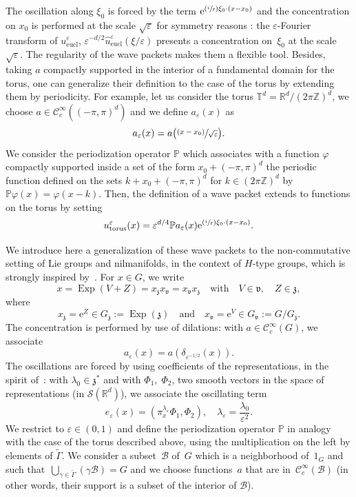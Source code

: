 \documentclass[JEP,XML,SOM,Unicode,published]{cedram}
\let\mathcal\mathscr
\newcommand{\Psfrac}[2]{(\sfrac{#1}{#2})}
\newcommand{\psfrac}[2]{\sfrac{(#1)}{#2}}
\newcommand{\eucl}{\mathrm{eucl}}
\newcommand{\rme}{\mathrm{e}}
\DeclareMathOperator{\Exp}{Exp}
\theoremstyle{plain}
\theoremstyle{definition}
\let\eps\varepsilon
\def\R{{\mathbb R}}
\def\Z{{\mathbb Z}}
\def\T{{\mathbb T}}
\def\bbP{{\mathbb P}}
\begin{document}
The oscillation along $\xi_0$ is forced by the term $\rme^{\Psfrac i\eps \xi_0\cdot(x-x_0)}$ and the concentration on $x_0$ is performed at the scale $\sqrt\eps$ for symmetry reasons : the $\eps$-Fourier transform of $u^\eps_\eucl$,
$\eps^{-d/2}\widehat u^\eps_\eucl (\xi/\eps)$ presents a concentration on~$\xi_0$ at the scale $\sqrt\eps$. The regularity of the wave packets makes them a flexible tool. Besides, taking $a$ compactly supported in the interior of a fundamental domain for the torus, one can generalize their definition to the case of the torus by extending them by periodicity. For example, let us consider the torus $\T^d=\R^d/(2\pi\Z)^d$, we choose $a\in{\mathcal C}_c^\infty((-\pi,\pi)^d)$ and we define $a_\eps(x) $ as
\[
a_\eps(x) = a\bigl(\psfrac{x-x_0}{\sqrt\eps}\bigr).
\]
We consider the periodization operator $\bbP$ which associates with a function $\varphi$ compactly supported inside a set of the form $x_0+(-\pi,\pi)^d$ the periodic function defined on the sets $k+x_0+(-\pi,\pi)^d$ for $k\in(2\pi\Z)^d$ by
$\bbP \varphi(x)= \varphi(x-k)$. Then, the definition of a wave packet extends to functions on the torus by setting
\[
u_\mathrm{torus}^\eps(x)= \eps^{d/4} \bbP a_\eps(x)\rme^{\Psfrac i\eps \xi_0\cdot(x-x_0)}.
\]

We introduce here a generalization of these wave packets to the non-commutative setting of Lie groups and nilmanifolds, in the context of $H$-type groups, which is strongly inspired by~\cite{FF1}.
For $x\in G$, we write
\[
x=\Exp(V+Z)= x_{\mathfrak z} x_{\mathfrak v} = x_{\mathfrak v} x_{\mathfrak z} \quad \text{with}\quad V\in{\mathfrak v},\quad Z\in{\mathfrak z},
\]
where
\[
x_{\mathfrak z} =\rme^Z\in G_{\mathfrak z}:=\Exp (\mathfrak z)\quad \text{and}\quad x_{\mathfrak v}=\rme^V\in G_{\mathfrak v}:=G/ G_{\mathfrak z}.
\]
The concentration is performed by use of dilations: with $a\in\mathcal C_c^\infty(G)$, we associate
\[
a_\eps(x)=a \left(\delta_{\eps^{-1/2 }}(x)\right).
\]
The oscillations are forced by using coefficients of the representations, in the spirit of~\cite{pedersen}: with $\lambda_0\in\mathfrak z^*$ and with
$\Phi_1,\; \Phi_2$, two smooth vectors in the space of representations (\ie in ${\mathcal S}(\R^d)$), we associate the oscillating term
\[
e_\eps(x)=\left(\pi^{\lambda_\eps}_x \Phi_1, \Phi_2\right), \quad \lambda_\eps= \frac{\lambda_0}{\eps^2}.
\]
We restrict to $\eps\in (0,1)$ and define the periodization operator $\bbP$ in analogy with the case of the torus described above, using the multiplication on the left by elements of $\widetilde\Gamma$. We consider a subset~$\mathcal B$ of~$G$ which is a neighborhood of~$1_G$ and such that~$\bigcup_{\gamma\in \widetilde{\Gamma}} (\gamma {\mathcal B})=G$ and we choose functions~$a$ that are in~${\mathcal C}^\infty_c(\mathcal B)$ (in other words, their support is a subset of the interior of $\mathcal B$).
\end{document}
